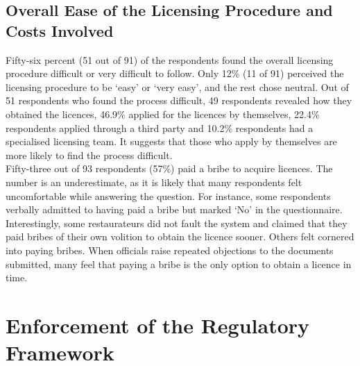 \documentclass[a4paper, 12pt]{article}
\begin{document}
		\subsection{Overall Ease of the Licensing Procedure and Costs Involved}
		Fifty-six percent (51 out of 91) of the respondents found the overall licensing procedure difficult or very difficult to follow. Only 12\% (11 of 91) perceived the licensing procedure to be ‘easy’ or ‘very easy’, and the rest chose neutral. Out of 51 respondents who found the process difficult, 49 respondents revealed how they obtained the licences, 46.9\% applied for the licences by themselves, 22.4\% respondents applied through a third party and 10.2\% respondents had a specialised licensing team. It suggests that those who apply by themselves are more likely to find the process difficult.\\
		Fifty-three out of 93 respondents (57\%) paid a bribe to acquire licences. The number is an underestimate, as it is likely that many respondents felt uncomfortable while answering the question. For instance, some respondents verbally admitted to having paid a bribe but marked ‘No’ in the questionnaire.\\
		Interestingly, some restaurateurs did not fault the system and claimed that they paid bribes of their own volition to obtain the licence sooner. Others felt cornered into paying bribes. When officials raise repeated objections to the documents submitted, many feel that paying a bribe is the only option to obtain a licence in time.
		
		

	
		\section{Enforcement of the Regulatory Framework}
		\label{sec:2}
		
\end{document}
